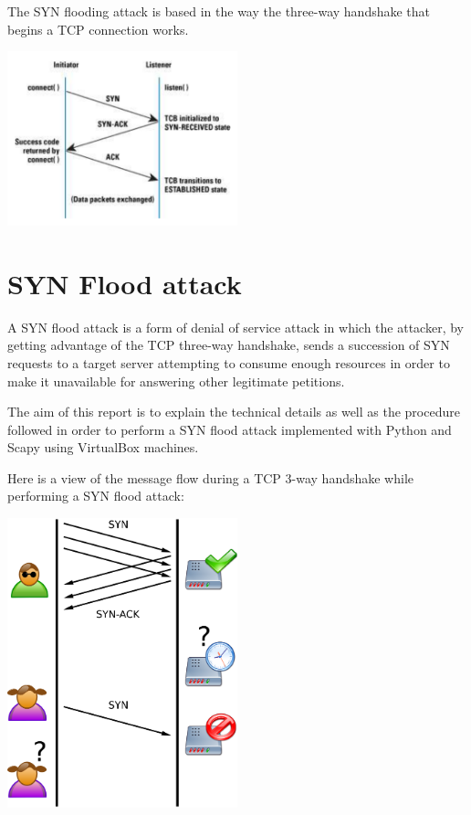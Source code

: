 \documentclass[11pt]{article}
\begin{document}
The SYN flooding attack is based in the way the three-way handshake that begins a TCP connection works.

\vfill\vfill
\vfill\includegraphics[width=0.5\textwidth]{3wayhandshake.png}\\[1cm]

\section{SYN Flood attack}
A SYN flood attack is a form of denial of service attack in which the attacker, by getting advantage of the TCP three-way handshake, sends a succession of SYN requests to a target server attempting to consume enough resources in order to make it unavailable for answering other legitimate petitions.\vspace{5mm}

The aim of this report is to explain the technical details as well as the procedure followed in order to perform a SYN flood attack implemented with Python and Scapy using VirtualBox machines.\vspace{5mm}

Here is a view of the message flow during a TCP 3-way handshake while performing a SYN flood attack:

\vfill\vfill
\includegraphics[width=0.5\textwidth]{tcp-synflood.png}\\[1cm]
\end{document}
